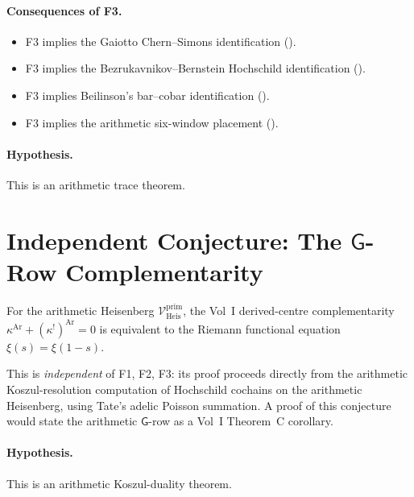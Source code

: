 \paragraph{Consequences of F3.}
\begin{itemize}
\item F3 implies the Gaiotto Chern--Simons identification
().
\item F3 implies the Bezrukavnikov--Bernstein Hochschild identification
().
\item F3 implies Beilinson's bar--cobar identification
().
\item F3 implies the arithmetic six-window placement
().
\end{itemize}

\paragraph{Hypothesis.} This is an arithmetic trace theorem.

\section{Independent Conjecture: The \(\mathsf{G}\)-Row Complementarity}
\label{v4-arith:app:C:G-row-independent}

\begin{conjecture}[\(\kappa+\kappa^{!}=0\Leftrightarrow\xi(s)=\xi(1-s)\)]
\label{v4-arith:app:C:G-row-statement}
For the arithmetic Heisenberg \(\mathcal{V}^{\mathrm{prim}}_{\mathrm{Heis}}\),
the Vol~I derived-centre complementarity
\(\kappa^{\mathrm{Ar}}+(\kappa^{!})^{\mathrm{Ar}}=0\) is equivalent
to the Riemann functional equation
\(\xi(s)=\xi(1-s)\).
\end{conjecture}

This is \emph{independent} of F1, F2, F3: its proof proceeds
directly from the arithmetic Koszul-resolution computation of
Hochschild cochains on the arithmetic Heisenberg, using Tate's
adelic Poisson summation. A proof of this conjecture would state
the arithmetic \(\mathsf{G}\)-row as a Vol~I Theorem~C corollary.

\paragraph{Hypothesis.} This is an arithmetic Koszul-duality theorem.

